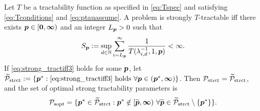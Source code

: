 \documentclass[11pt,a4paper]{article}
\begin{document}
\begin{theorem}\label{thm_main_strong_tract2}
Let $T$ be a tractability function as specified in \eqref{eq:Tspec} and satisfying \eqref{eq:Tconditions} and \eqref{eq:ptauassume}.  A problem is strongly $T$-tractable iff there exists $\boldsymbol{p} \in [\boldsymbol{0}, \boldsymbol{\infty})$ and an integer $L_{\boldsymbol{p}} > 0$ such that
\begin{equation} \label{eq:strong_tractiff3}
     S_{\boldsymbol{p}}:=\sup_{d \in \mathbb{N}} \sum_{i = L_{\boldsymbol{p}}}^\infty \frac{1}{T(\lambda_{i,d}^{-1},1,\boldsymbol{p})} < \infty.
\end{equation}
If \eqref{eq:strong_tractiff3} holds for some $\boldsymbol{p}$, let  $\widetilde{\mathcal{P}}_{\textup{strct}} : = \{\boldsymbol{p}^* : \eqref{eq:strong_tractiff3} \text{ holds }\forall \boldsymbol{p} \in (\boldsymbol{p}^*,\boldsymbol{\infty})\}$.  Then $\mathcal{P}_{\textup{strct}} = \widetilde{\mathcal{P}}_{\textup{strct}}$, and the set of optimal strong tractability parameters is
\[
	\mathcal{P}_{\textup{sopt}} =
	\{\boldsymbol{p}^* \in \widetilde{\mathcal{P}}_{\textup{strct}} :  \boldsymbol{p}^* \notin [\widetilde{\boldsymbol{p}},\boldsymbol{\infty}) \ \forall \widetilde{\boldsymbol{p}}\in  \widetilde{\mathcal{P}}_{\textup{strct}} \setminus \{\boldsymbol{p}^*\} \}.
\]
\end{theorem}
\end{document}
